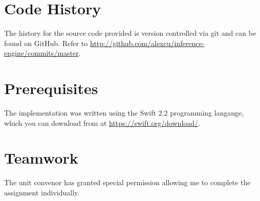 \section*{Code History}
\label{sec:History}
The history for the source code provided is version controlled via git and can
be found on GitHub. Refer to \url{http://github.com/alexcu/inference-engine/commits/master}.

\section*{Prerequisites}
The implementation was written using the Swift 2.2 programming langauge,
which you can download from at \url{https://swift.org/download/}.

\section*{Teamwork}
The unit convenor has granted special permission allowing me to complete
the assignment individually.

